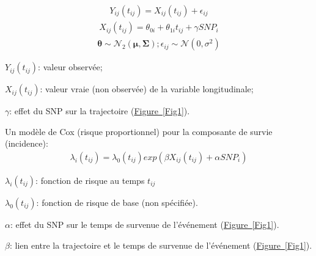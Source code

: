 \documentclass[10pt,a0,portrait]{a0poster}
\newcommand\bref[2]{\hyperref[#1]{#2~\ref*{#1}}}
\begin{document}
\begin{multicols}{2}
\begin{minipage}[t]{0.475\columnwidth}
\vspace{-1cm}%
\hspace{-10cm}
{\color{springgreen3}%
\begin{eqnarray}Y_{ij}(t_{ij})=X_{ij}(t_{ij})+\epsilon_{ij}\nonumber\label{Eq1}\end{eqnarray}
\begin{eqnarray}X_{ij}(t_{ij})=\theta_{0i}+\theta_{1i}t_{ij}+\gamma SNP_i\nonumber\label{Eq2}\end{eqnarray}
\begin{eqnarray}\boldsymbol\theta \sim \mathcal{N}_2(\boldsymbol\mu, \boldsymbol\Sigma)\nonumber\label{Eq3}; \epsilon_{ij} \sim \mathcal{N}(0, \sigma^2)\nonumber\label{Eq4}\end{eqnarray}
}%
\vspace{-1cm}
\end{minipage}%
\hfill\vline\hfill
\begin{minipage}[t]{0.475\columnwidth}%
\vspace{0.8cm}%
\par{{\color{springgreen3}$Y_{ij}(t_{ij})$}: valeur observée;}
\vspace{0.25cm}%
\par{{\color{springgreen3}$X_{ij}(t_{ij})$}: valeur vraie (non observée) de la variable longitudinale;}
\vspace{0.25cm}%
\par{{\color{springgreen3}$\gamma$}: effet du SNP sur la trajectoire (\mbox{\bref{Fig1}{Figure}}).}
\end{minipage}
\vspace{3cm}
\par{Un modèle de Cox (risque proportionnel) pour la composante de survie (incidence):}
{\color{springgreen3}\begin{eqnarray}\lambda_i(t_{ij})=\lambda_0(t_{ij}) exp(\beta X_{ij}(t_{ij})+\alpha SNP_i)\nonumber\label{Eq5}\end{eqnarray}}
\begin{minipage}[t]{0.475\columnwidth}
\vspace{0.10cm}%
\par{{\color{springgreen3}$\lambda_i(t_{ij})$}: fonction de risque au temps {\color{springgreen3}$t_{ij}$}}
\vspace{1.85cm}%
\par{{\color{springgreen3}$\lambda_0(t_{ij})$}: fonction de risque de base (non spécifiée).}
\end{minipage}%
\hfill\vline\hfill
\begin{minipage}[t]{0.475\columnwidth}%
\vspace{0.10cm}%
\par{{\color{springgreen3}$\alpha$}: effet du SNP sur le temps de survenue de l'événement (\mbox{\bref{Fig1}{Figure}}).}
\par{{\color{springgreen3}$\beta$}: lien entre la trajectoire et le temps de survenue de l'événement (\mbox{\bref{Fig1}{Figure}}).}
\end{minipage}



\end{multicols}
\end{document}
